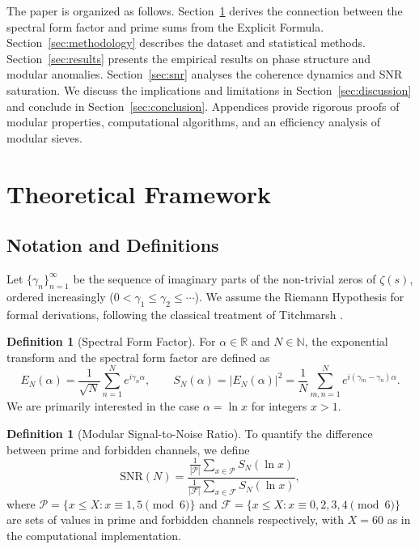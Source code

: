 \documentclass[12pt,a4paper]{article}
\theoremstyle{plain}
\theoremstyle{definition}
\newtheorem{definition}[theorem]{Definition}
\theoremstyle{remark}
\begin{document}
The paper is organized as follows. Section~\ref{sec:theory} derives the connection between the spectral form factor and prime sums from the Explicit Formula. Section~\ref{sec:methodology} describes the dataset and statistical methods. Section~\ref{sec:results} presents the empirical results on phase structure and modular anomalies. Section~\ref{sec:snr} analyses the coherence dynamics and SNR saturation. We discuss the implications and limitations in Section~\ref{sec:discussion} and conclude in Section~\ref{sec:conclusion}. Appendices provide rigorous proofs of modular properties, computational algorithms, and an efficiency analysis of modular sieves.

\section{Theoretical Framework}
\label{sec:theory}

\subsection{Notation and Definitions}
Let \(\{\gamma_n\}_{n=1}^\infty\) be the sequence of imaginary parts of the non-trivial zeros of \(\zeta(s)\), ordered increasingly (\(0 < \gamma_1 \leq \gamma_2 \leq \cdots\)). We assume the Riemann Hypothesis for formal derivations, following the classical treatment of Titchmarsh \cite{titchmarsh1986}.

\begin{definition}[Spectral Form Factor]
For \(\alpha \in \mathbb{R}\) and \(N \in \mathbb{N}\), the exponential transform and the spectral form factor are defined as
\begin{equation}
E_N(\alpha) = \frac{1}{\sqrt{N}} \sum_{n=1}^N e^{i\gamma_n \alpha}, \qquad
S_N(\alpha) = |E_N(\alpha)|^2 = \frac{1}{N} \sum_{m,n=1}^N e^{i(\gamma_m - \gamma_n)\alpha}.
\label{eq:form_factor}
\end{equation}
We are primarily interested in the case \(\alpha = \ln x\) for integers \(x > 1\).
\end{definition}

\begin{definition}[Modular Signal-to-Noise Ratio]
To quantify the difference between prime and forbidden channels, we define
\begin{equation}
\mathrm{SNR}(N) = \frac{\displaystyle \frac{1}{|\mathcal{P}|} \sum_{x \in \mathcal{P}} S_N(\ln x)}{\displaystyle \frac{1}{|\mathcal{F}|} \sum_{x \in \mathcal{F}} S_N(\ln x)},
\label{eq:SNR}
\end{equation}
where \(\mathcal{P} = \{x \leq X : x \equiv 1,5 \pmod{6}\}\) and \(\mathcal{F} = \{x \leq X : x \equiv 0,2,3,4 \pmod{6}\}\) are sets of values in prime and forbidden channels respectively, with \(X = 60\) as in the computational implementation.
\end{definition}
\end{document}
